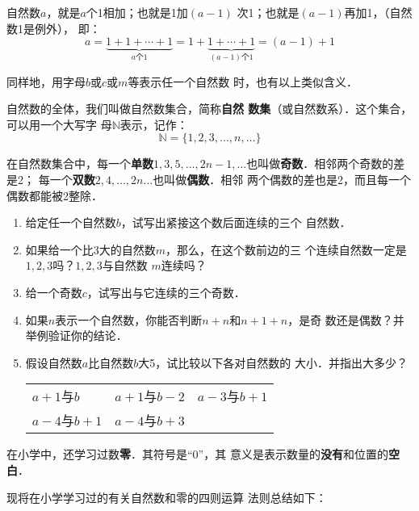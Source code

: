 自然数$a$，就是$a$个1相加；也就是1加$(a- 1)$
次1；也就是$(a-1)$再加1，（自然数1是例外），
即：
\[a=\underbrace{1+1+\cdots+1}_{a\text{个} 1}=1+\underbrace{1+\cdots+1}_{(a-1)\text{个} 1} = (a-1)+1\]

同样地，用字母$b$或$c$或$m$等表示任一个自然数
时，也有以上类似含义．

自然数的全体，我们叫做自然数集合，简称\textbf{自然
	数集}（或自然数系）．这个集合，可以用一个大写字
母$\mathbb{N}$表示，记作：
\[\mathbb{N}=\{1,2,3,\ldots,n,\ldots \} \]

在自然数集合中，每一个\textbf{单数}$1, 3, 5,\ldots, 2n-1,\ldots$也叫做\textbf{奇数}．相邻两个奇数的差是2；
每一个\textbf{双数}$2 ,  4 , \ldots,  2n\ldots$也叫做\textbf{偶数}．相邻
两个偶数的差也是2，而且每一个偶数都能被2整除．

\begin{ex}
	\begin{enumerate}
		\item  给定任一个自然数$b$，试写出紧接这个数后面连续的三个
		自然数．
		\item  如果给一个比3大的自然数$m$，那么，在这个数前边的三
		个连续自然数一定是$1,  2,  3$吗？$1,  2,  3$与自然数
		$m$连续吗？
		\item  给一个奇数$c$，试写出与它连续的三个奇数．
		\item  如果$n$表示一个自然数，你能否判断$n+n$和$n+1+n$，是奇
		数还是偶数？并举例验证你的结论．
		\item 假设自然数$a$比自然数$b$大5，试比较以下各对自然数的
		大小．并指出大多少？
		\begin{center}
			\begin{tabular}{p{.2\textwidth}p{}p{}}
				$a+1$与$b$&
				$a + 1$与$b-2$&
				$a-3$与$b + 1$\\
				$a-4$与$b+1$&
				$a-4$与$b+ 3$\\
			\end{tabular}
		\end{center}
		
	\end{enumerate}  
\end{ex}

在小学中，还学习过数\textbf{零}．其符号是“0”，其
意义是表示数量的\textbf{没有}和位置的\textbf{空白}．

现将在小学学习过的有关自然数和零的四则运算
法则总结如下：


